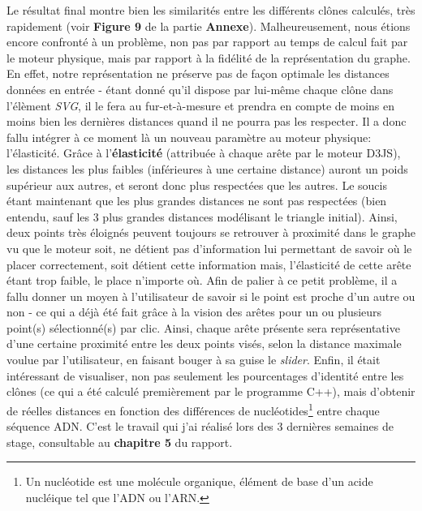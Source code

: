 \documentclass[12pt]{report}
\begin{document}
\begin{spacing}{1.2}
Le résultat final montre bien les similarités entre les différents clônes calculés, très rapidement (voir \textbf{Figure 9} de la partie \textbf{Annexe}).
\newline
Malheureusement, nous étions encore confronté à un problème, non pas par rapport au temps de calcul fait par le moteur physique, mais par rapport à la fidélité de la représentation du graphe.
\newline
En effet, notre représentation ne préserve pas de façon optimale les distances données en entrée - étant donné qu'il dispose par lui-même chaque clône dans l'élèment \textit{SVG}, il le fera au fur-et-à-mesure et prendra en compte de moins en moins bien les dernières distances quand il ne pourra pas les respecter.
\newline
Il a donc fallu intégrer à ce moment là un nouveau paramètre au moteur physique: l'élasticité. Grâce à l'\textbf{élasticité} (attribuée à chaque arête par le moteur D3JS), les distances les plus faibles (inférieures à une certaine distance) auront un poids supérieur aux autres, et seront donc plus respectées que les autres.
\newline
Le soucis étant maintenant que les plus grandes distances ne sont pas respectées (bien entendu, sauf les 3 plus grandes distances modélisant le triangle initial). Ainsi, deux points très éloignés peuvent toujours se retrouver à proximité dans le graphe vu que le moteur soit, ne détient pas d'information lui permettant de savoir où le placer correctement, soit détient cette information mais, l'élasticité de cette arête étant trop faible, le place n'importe où.
\newline
Afin de palier à ce petit problème, il a fallu donner un moyen à l'utilisateur de savoir si le point est proche d'un autre ou non - ce qui a déjà été fait grâce à la vision des arêtes pour un ou plusieurs point(s) sélectionné(s) par clic. Ainsi, chaque arête présente sera représentative d'une certaine proximité entre les deux points visés, selon la distance maximale voulue par l'utilisateur, en faisant bouger à sa guise le \textit{slider}.
\newline
Enfin, il était intéressant de visualiser, non pas seulement les pourcentages d'identité entre les clônes (ce qui a été calculé premièrement par le programme C++), mais d'obtenir de réelles distances en fonction des différences de nucléotides\footnote{Un nucléotide est une molécule organique, élément de base d'un acide nucléique tel que l'ADN ou l'ARN.} entre chaque séquence ADN. C'est le travail qui j'ai réalisé lors des 3 dernières semaines de stage, consultable au \textbf{chapitre 5} du rapport.


\end{spacing}
\end{document}
